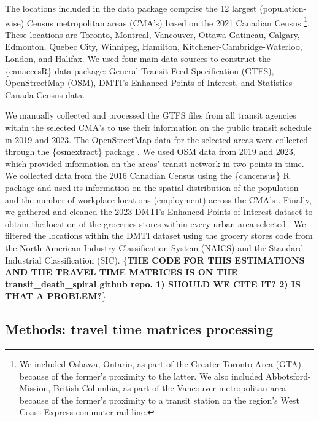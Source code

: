 \documentclass[Royal,times,sageh]{sagej}
\begin{document}
The locations included in the data package comprise the 12 largest
(population-wise) Census metropolitan areas (CMA's) based on the 2021
Canadian Census \citep{governmentofcanada2021CensusPopulation2021}
\footnote{We included Oshawa, Ontario, as part of the Greater Toronto
  Area (GTA) because of the former's proximity to the latter. We also
  included Abbotsford-Mission, British Columbia, as part of the
  Vancouver metropolitan area because of the former's proximity to a
  transit station on the region's West Coast Express commuter rail line.}.
These locations are Toronto, Montreal, Vancouver, Ottawa-Gatineau,
Calgary, Edmonton, Quebec City, Winnipeg, Hamilton,
Kitchener-Cambridge-Waterloo, London, and Halifax. We used four main
data sources to construct the \{canaccesR\} data package: General
Transit Feed Specification (GTFS), OpenStreetMap (OSM), DMTI's Enhanced
Points of Interest, and Statistics Canada Census data.

We manually collected and processed the GTFS files from all transit
agencies within the selected CMA's to use their information on the
public transit schedule in 2019 and 2023. The OpenStreetMap data for the
selected areas were collected through the \{osmextract\} package
\citep{gilardiOsmextractDownloadImport2025}. We used OSM data from 2019
and 2023, which provided information on the areas' transit network in
two points in time. We collected data from the 2016 Canadian Census
using the \{cancensus\} R package
\citep{vonbergmannCancensusPackageAccess2022} and used its information
on the spatial distribution of the population and the number of
workplace locations (employment) across the CMA's
\citep{governmentofcanada2016CensusPopulation2016}. Finally, we gathered
and cleaned the 2023 DMTI's Enhanced Points of Interest dataset to
obtain the location of the groceries stores within every urban area
selected \citep{dmtispatialincEnhancedPointsInterest2015}. We filtered
the locations within the DMTI dataset using the grocery stores code from
the North American Industry Classification System (NAICS) and the
Standard Industrial Classification (SIC). \{\textbf{THE CODE FOR THIS
ESTIMATIONS AND THE TRAVEL TIME MATRICES IS ON THE
transit\_death\_spiral github repo. 1) SHOULD WE CITE IT? 2) IS THAT A
PROBLEM?}\}

\subsection{Methods: travel time matrices
processing}\label{methods-travel-time-matrices-processing}
\end{document}
